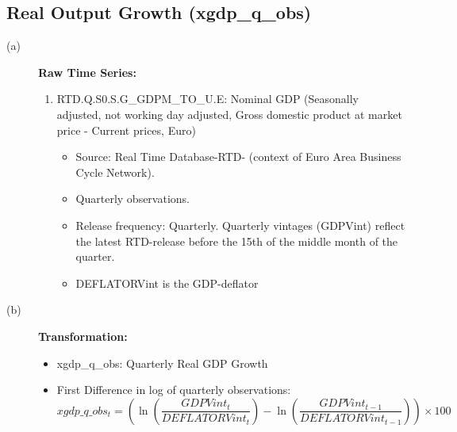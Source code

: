 \documentclass[3p,review,times]{elsarticle}		%
\begin{document}
\subsection{Real Output Growth (xgdp\_q\_obs)}
\begin{description}
	\item[(a)] \textbf{Raw Time Series:} 
	\begin{enumerate}
		\item RTD.Q.S0.S.G\_GDPM\_TO\_U.E: Nominal GDP (Seasonally adjusted, not working day adjusted, Gross domestic product at market price - Current prices, Euro)
		\begin{itemize}
			\item Source:  Real Time Database-RTD- (context of Euro Area Business Cycle Network). 
			\item Quarterly observations. 
			\item Release frequency: Quarterly. Quarterly vintages (GDPVint) reflect the latest RTD-release before the 15th of the middle month of the quarter.
			\item DEFLATORVint is the GDP-deflator
		\end{itemize}			
	\end{enumerate}
	\item[(b)] \textbf{Transformation:}
	\begin{itemize}
		\item xgdp\_q\_obs: Quarterly  Real GDP Growth
		\item First Difference in log of quarterly observations:
		$$xgdp\_q\_obs_{t}=(\ln\left(\frac{GDPVint_t}{DEFLATORVint_t}\right)-\ln\left(\frac{GDPVint_{t-1}}{DEFLATORVint_{t-1}}\right))\times 100$$
	\end{itemize}
\end{description}
\end{document}
